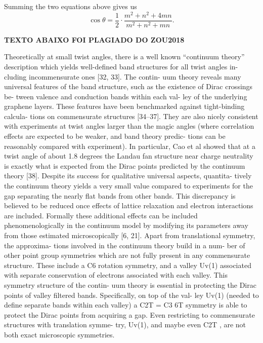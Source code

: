 Summing the two equations above gives us
\begin{equation} \label{eq:costheta}
\boxed{\cos\theta = \frac{1}{2} \cdot \frac{m^2 + n^2 + 4mn}{m^2 + n^2 + mn}.}
\end{equation}



\n

\textbf{TEXTO ABAIXO FOI PLAGIADO DO ZOU2018}

Theoretically at small twist angles, there is a well
known “continuum theory” description which yields
well-defined band structures for all twist angles in-
cluding incommensurate ones [32, 33].
The contin-
uum theory reveals many universal features of the band
structure, such as the existence of Dirac crossings be-
tween valence and conduction bands within each val-
ley of the underlying graphene layers. These features
have been benchmarked against tight-binding calcula-
tions on commensurate structures [34–37]. They are
also nicely consistent with experiments at twist angles
larger than the magic angles (where correlation effects
are expected to be weaker, and band theory predic-
tions can be reasonably compared with experiment).
In particular, Cao et al showed that at a twist angle of
about 1.8 degrees the Landau fan structure near charge
neutrality is exactly what is expected from the Dirac
points predicted by the continuum theory [38]. Despite
its success for qualitative universal aspects, quantita-
tively the continuum theory yields a very small value
compared to experiments for the gap separating the
nearly flat bands from other bands. This discrepancy is
believed to be reduced once effects of lattice relaxation
and electron interactions are included. Formally these
additional effects can be included phenomenologically
in the continuum model by modifying its parameters
away from those estimated microscopically [6, 21].
Apart from translational symmetry, the approxima-
tions involved in the continuum theory build in a num-
ber of other point group symmetries which are not fully
present in any commensurate structure. These include
a C6 rotation symmetry, and a valley Uv(1) associated
with separate conservation of electrons associated with
each valley.
This symmetry structure of the contin-
uum theory is essential in protecting the Dirac points
of valley filtered bands. Specifically, on top of the val-
ley Uv(1) (needed to define separate bands within each
valley) a C2T = C3
6T symmetry is able to protect the
Dirac points from acquiring a gap.
Even restricting
to commensurate structures with translation symme-
try, Uv(1), and maybe even C2T , are not both exact
microscopic symmetries.

